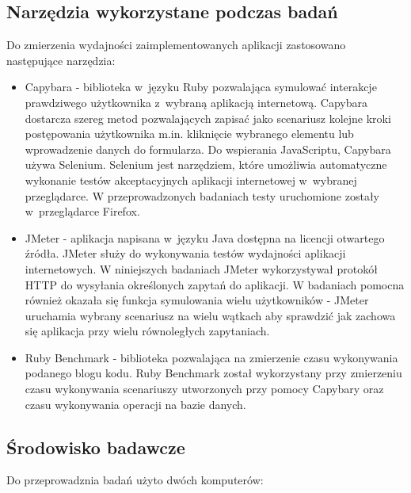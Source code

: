 \documentclass[archivemode]{mgr}
\begin{document}
\subsection{Narzędzia wykorzystane podczas badań}
Do zmierzenia wydajności zaimplementowanych aplikacji zastosowano następujące narzędzia:
\begin{itemize}
  \item{Capybara} - biblioteka w~języku Ruby pozwalająca symulować interakcje prawdziwego użytkownika z~wybraną aplikacją internetową. Capybara dostarcza szereg metod pozwalających zapisać jako scenariusz kolejne kroki postępowania użytkownika m.in. kliknięcie wybranego elementu lub wprowadzenie danych do formularza. Do wspierania JavaScriptu, Capybara używa Selenium. Selenium jest narzędziem, które umożliwia automatyczne wykonanie testów akceptacyjnych aplikacji internetowej w~wybranej przeglądarce. W przeprowadzonych badaniach testy uruchomione zostały w~przeglądarce Firefox. \cite{doc_capybara}
  \item{JMeter} - aplikacja napisana w~języku Java dostępna na licencji otwartego źródła. JMeter służy do wykonywania testów wydajności aplikacji internetowych. W niniejszych badaniach JMeter wykorzystywał protokół HTTP do wysyłania określonych zapytań do aplikacji. W badaniach pomocna również okazała się funkcja symulowania wielu użytkowników - JMeter uruchamia wybrany scenariusz na wielu wątkach aby sprawdzić jak zachowa się aplikacja przy wielu równoległych zapytaniach. \cite{doc_jmeter}
  \item{Ruby Benchmark} - biblioteka pozwalająca na zmierzenie czasu wykonywania podanego blogu kodu. Ruby Benchmark został wykorzystany przy zmierzeniu czasu wykonywania scenariuszy utworzonych przy pomocy Capybary oraz czasu wykonywania operacji na bazie danych. \cite{doc_benchmark}
\end{itemize}

\subsection{Środowisko badawcze}

Do przeprowadznia badań użyto dwóch komputerów:
\end{document}
